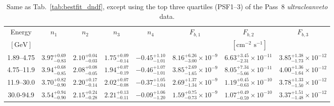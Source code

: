 \vspace{-4in}
\begin{table}[phtb]
\renewcommand{\arraystretch}{1.4}
\setlength{\tabcolsep}{3pt}
\begin{center}
\begin{tabular}{ c  | c  c  c c |  c c c   }
 Energy & $n_1$ & $n_2$ & $n_3$ & $n_4$ & $F_{b,1}$ & $F_{b,2}$ & $F_{b,3}$   \\
$[\text{GeV}]$ &  & & & & \multicolumn{3}{c}{$\left[\text{cm}^{-2}\text{ s}^{-1}\right]$}    \\
\hline
1.89--4.75 &  
$3.97_{-0.83}^{+0.69}$ & $2.10_{-0.03}^{+0.04}$ & $1.75_{-0.14}^{+0.09}$ & $-0.45_{-1.01}^{+1.10}$ & $8.16_{-3.00}^{+6.26} \times 10^{-9}$& $6.63_{-2.31}^{+3.45} \times 10^{-11}$ &$3.85_{-1.73}^{+1.38} \times 10^{-12}$     \\
4.75--11.9 &    
$3.94_{-0.85}^{+0.68}$ & $2.08_{-0.05}^{+0.08}$ & $1.94_{-0.19}^{+0.07}$ & $-0.46_{-1.01}^{+1.07}$ & $3.85_{-1.65}^{+2.69} \times 10^{-9}$& $8.05_{-5.66}^{+7.34} \times 10^{-11}$ & $4.00_{-1.64}^{+1.36} \times 10^{-12}$    \\
11.9--30.0  & 
$3.70_{-0.90}^{+0.82}$ & $2.20_{-0.14}^{+0.17}$ & $2.02_{-0.08}^{+0.07}$ & $-0.37_{-1.04}^{+1.05}$ & $2.69_{-1.34}^{+1.37} \times 10^{-9}$& $1.19_{-0.63}^{+0.45} \times 10^{-10}$ & $3.78_{-1.50}^{+1.33} \times 10^{-12}$ 
  \\  
30.0-94.9  &  
$3.54_{-0.90}^{+0.94}$ & $2.15_{-0.28}^{+0.24}$ & $2.21_{-0.11}^{+0.13}$ & $-0.09_{-1.20}^{+1.06}$ &  $1.59_{-0.73}^{+0.75} \times 10^{-9}$& $1.07_{-0.59}^{+0.49} \times 10^{-10}$ &  $3.37_{-1.48}^{+1.51} \times 10^{-12}$ \\
\end{tabular}
\end{center}
\caption{Same as Tab.~\ref{tab:bestfit_dndf}, except using the top three quartiles (PSF1--3) of the Pass~8 {\it ultracleanveto} data.  }
\label{tab:bestfit_dndf_lowQ3}
\end{table}

